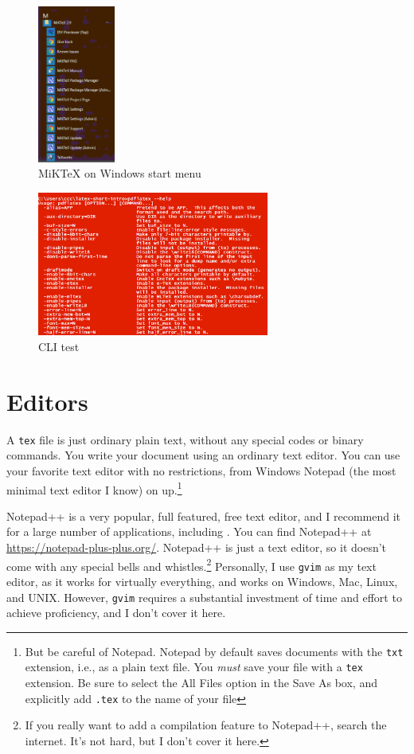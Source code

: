     \begin{figure}[!hb]
        \includegraphics[width=1in]{images/miktex-winstart.pdf}
        \caption{MiKTeX on Windows start menu}
        \label{img:MiKTeX winstart}
    \end{figure}

    \begin{figure}[!hb]
        \includegraphics[width=3in]{images/install-test.pdf}
        \caption{CLI test}
        \label{img:CLI test}
    \end{figure}

    \section{\LaTeXe Editors}
    \label{Editors}

    A \texttt{tex} file is just ordinary plain text, without any special codes or binary commands. You write your \Lx{} document using an ordinary text editor. You can use your favorite text editor with no restrictions, from Windows Notepad (the most minimal text editor I know) on up.\footnote{But be careful of Notepad. Notepad by default saves documents with the \texttt{txt} extension, i.e., as a plain text file. You \textit{must} save your \Lx{} file with a \texttt{tex} extension. Be sure to select the All Files option in the Save As box, and explicitly add \texttt{.tex} to the name of your file}

    Notepad++ is a very popular, full featured, free text editor, and I recommend it for a large number of applications, including \Lx{}. You can find Notepad++ at \url{https://notepad-plus-plus.org/}. Notepad++ is just a text editor, so it doesn't come with any special bells and whistles.\footnote{If you really want to add a compilation feature to Notepad++, search the internet. It's not hard, but I don't cover it here.} Personally, I use \texttt{gvim} as my text editor, as it works for virtually everything, and works on Windows, Mac, Linux, and UNIX. However, \texttt{gvim} requires a substantial investment of time and effort to achieve proficiency, and I don't cover it here.

